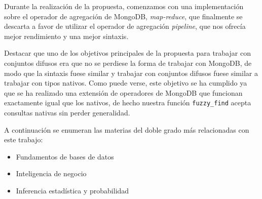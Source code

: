 Durante la realización de la propuesta, comenzamos con una implementación sobre el operador de agregación de MongoDB, \textit{map-reduce}, que finalmente se descarta a favor de utilizar el operador de agregación \textit{pipeline}, que nos ofrecía mejor rendimiento y una mejor sintaxis.

Destacar que uno de los objetivos principales de la propuesta para trabajar con conjuntos difusos era que no se perdiese la forma de trabajar con MongoDB, de modo que la sintaxis fuese similar y trabajar con conjuntos difusos fuese similar a trabajar con tipos nativos. Como puede verse, este objetivo se ha cumplido ya que se ha realizado una extensión de operadores de MongoDB que funcionan exactamente igual que los nativos, de hecho nuestra función \texttt{fuzzy\_find} acepta consultas nativas sin perder generalidad.

A continuación se enumeran las materias del doble grado más relacionadas con este trabajo:
\begin{itemize}
    \item Fundamentos de bases de datos
    \item Inteligencia de negocio
    \item Inferencia estadística y probabilidad
\end{itemize}

\newpage
